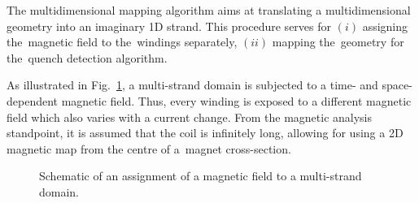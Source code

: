 
The multidimensional mapping algorithm aims at translating a multidimensional geometry into an imaginary 1D strand. This procedure serves for $(i)$ assigning the~magnetic field to the~windings separately, $(ii)$ mapping the~geometry for the~quench detection algorithm. 

As illustrated in Fig.~\ref{fig: 3d_coil_illustation_with_2d_b_field}, a multi-strand domain is subjected to a time- and space-dependent magnetic field. Thus, every winding is exposed to a different magnetic field which also varies with a current change. From the magnetic analysis standpoint, it is assumed that the coil is infinitely long, allowing for using a 2D magnetic map from the centre of a~magnet cross-section.

\begin{figure}[H]
    \centering
    \caption{Schematic of an assignment of a magnetic field to a multi-strand domain.}
    \label{fig: 3d_coil_illustation_with_2d_b_field}
\end{figure}

